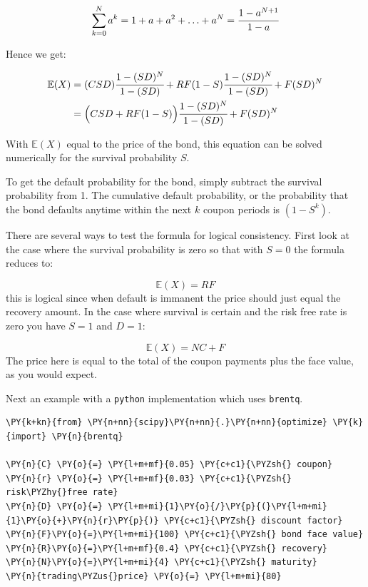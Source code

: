 {\begin{equation}\sum_{k=0}^N a^k = 1 + a + a^2 + \ldots + a^N = \cfrac{1-a^{N+1}}{1-a} \end{equation}

Hence we get:

\begin{align}
\begin{split}
\mathbb{E}(X) &= (CSD) \cfrac{1-(SD)^N}{1-(SD)}+RF(1-S)\cfrac{1-(SD)^N}{1-(SD)} + F(SD)^N \\
&= \Big(CSD + RF(1-S)\Big)\cfrac{1-(SD)^N}{1-(SD)} + F(SD)^N 
\end{split}
\end{align}

With $\mathbb{E}(X)$ equal to the price of the bond, this equation can be solved numerically for the survival probability $S$.

To get the default probability for the bond, simply subtract the survival
probability from 1. The cumulative default probability, or the probability that the bond defaults anytime within the next $k$ coupon periods is $(1 - S^k)$.

There are several ways to test the formula for logical consistency. First look
at the case where the survival probability is zero so that with $S = 0$ the
formula reduces to:

\begin{equation}\mathbb{E}(X) = RF\end{equation}
this is logical since when default is immanent the price should just equal the
recovery amount.
In the case where survival is certain and the risk free rate is zero you have
$S = 1$ and $D=1$:

\begin{equation}\mathbb{E}(X) = NC + F \end{equation}
The price here is equal to the total of the coupon payments plus the face
value, as you would expect.

Next an example with a \texttt{python} implementation which uses \texttt{brentq}.

\begin{tcolorbox}[breakable, size=fbox, boxrule=1pt, pad at break*=1mm,colback=cellbackground, colframe=cellborder]
\begin{Verbatim}[commandchars=\\\{\}]
\PY{k+kn}{from} \PY{n+nn}{scipy}\PY{n+nn}{.}\PY{n+nn}{optimize} \PY{k}{import} \PY{n}{brentq}
	
\PY{n}{C} \PY{o}{=} \PY{l+m+mf}{0.05} \PY{c+c1}{\PYZsh{} coupon}
\PY{n}{r} \PY{o}{=} \PY{l+m+mf}{0.03} \PY{c+c1}{\PYZsh{} risk\PYZhy{}free rate}
\PY{n}{D} \PY{o}{=} \PY{l+m+mi}{1}\PY{o}{/}\PY{p}{(}\PY{l+m+mi}{1}\PY{o}{+}\PY{n}{r}\PY{p}{)} \PY{c+c1}{\PYZsh{} discount factor}
\PY{n}{F}\PY{o}{=}\PY{l+m+mi}{100} \PY{c+c1}{\PYZsh{} bond face value}
\PY{n}{R}\PY{o}{=}\PY{l+m+mf}{0.4} \PY{c+c1}{\PYZsh{} recovery}
\PY{n}{N}\PY{o}{=}\PY{l+m+mi}{4} \PY{c+c1}{\PYZsh{} maturity}
\PY{n}{trading\PYZus{}price} \PY{o}{=} \PY{l+m+mi}{80}
	

\end{Verbatim}
\end{tcolorbox}}
